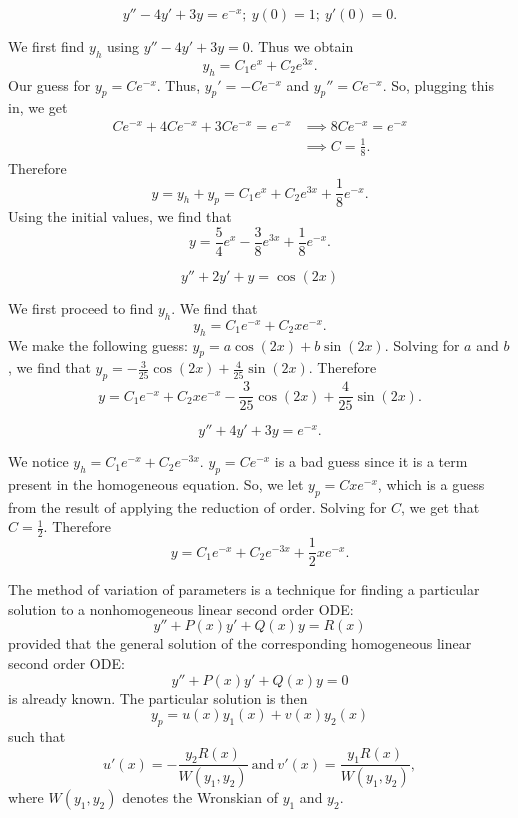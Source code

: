 \begin{example}
    $$y''-4y' + 3y = e^{-x};~y(0) = 1;~y'(0)=0.$$
\end{example}
\begin{soln}
    We first find $y_h$ using $y''-4y'+3y = 0$. Thus we obtain
    $$y_h = C_1e^x+C_2e^{3x}.$$ Our guess for $y_p = Ce^{-x}$.
    Thus, $y_p' = -Ce^{-x}$ and $y_p'' = Ce^{-x}$. So, plugging this in,
    we get 
    \begin{align*}
        Ce^{-x}+4Ce^{-x}+3Ce^{-x} = e^{-x} &\implies 8Ce^{-x} = e^{-x} \\
                                           &\implies C = \frac{1}{8}.
    \end{align*}
    Therefore $$y = y_h + y_p = C_1e^{x}+C_2e^{3x} + \frac{1}{8}e^{-x}.$$
    Using the initial values, we find that
    $$\boxed{y = \frac{5}{4}e^{x}-\frac{3}{8}e^{3x} + \frac{1}{8}e^{-x}}.$$
\end{soln}
\begin{example}
   $$ y''+2y'+y = \cos(2x)$$
\end{example}
\begin{soln}
    We first proceed to find $y_h$. We find that
    $$y_h = C_1e^{-x}+C_2xe^{-x}.$$
    We make the following guess: $y_p = a\cos(2x) + b\sin(2x)$. Solving
    for $a$ and $b$, we find that $y_p = -\frac{3}{25}\cos(2x) + \frac{4}{25}\sin(2x)$.
    Therefore 
    $$\boxed{y = C_1e^{-x}+C_2xe^{-x} - \frac{3}{25}\cos(2x)+\frac{4}{25}\sin(2x)}.$$
\end{soln}
\begin{example}
    $$y''+4y'+3y = e^{-x}.$$
\end{example}
\begin{soln}
    We notice $y_h = C_1e^{-x} + C_2e^{-3x}$. $y_p = Ce^{-x}$ is a bad guess since it is a term present in the
    homogeneous equation. So, we let $y_p = Cxe^{-x}$, which is a guess from
    the result of applying the reduction of order. Solving for $C$, we get
    that $C = \frac{1}{2}$. Therefore 
    $$\boxed{y = C_1e^{-x}+C_2e^{-3x}+\frac{1}{2}xe^{-x}}.$$
\end{soln}
\begin{theorem}
    The method of variation of parameters is a technique for finding a particular 
    solution to a nonhomogeneous linear second order ODE:
    $$y''+P(x)y'+Q(x)y = R(x)$$
    provided that the general solution of the corresponding homogeneous linear 
    second order ODE:
    $$y''+P(x)y'+Q(x)y = 0$$ is already known. The particular solution is then
    $$y_p = u(x)y_1(x)+v(x)y_2(x)$$ such that
    $$u'(x) = -\frac{y_2R(x)}{W(y_1,y_2)}~\text{and}~v'(x) = \frac{y_1R(x)}{W(y_1,y_2)},$$
    where $W(y_1,y_2)$ denotes the Wronskian of $y_1$ and $y_2$.
\end{theorem}
